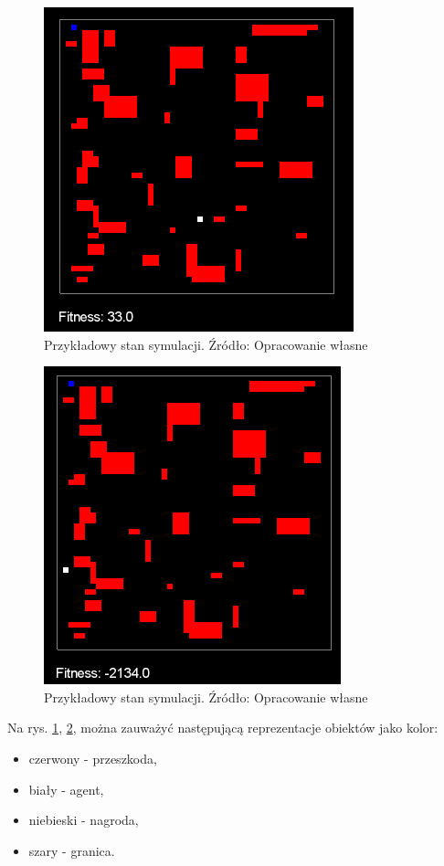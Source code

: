 \begin{figure}[h!]
    \centering
    \includegraphics[scale=0.4]{symulacja}
    \caption{Przykładowy stan symulacji. Źródło: Opracowanie własne}
    \label{fig:symulacja}
\end{figure}

\begin{figure}[h!]
    \centering
    \includegraphics[scale=0.4]{symulacja2}
    \caption{Przykładowy stan symulacji. Źródło: Opracowanie własne}
    \label{fig:symulacja2}
\end{figure}

Na rys. \ref{fig:symulacja}, \ref{fig:symulacja2}, można zauważyć następującą reprezentacje obiektów jako kolor:
\begin{itemize}
\renewcommand{\labelitemi}{$\bullet$}
 \item czerwony - przeszkoda,
 \item biały - agent,
 \item niebieski - nagroda,
 \item szary - granica.
\end{itemize}


